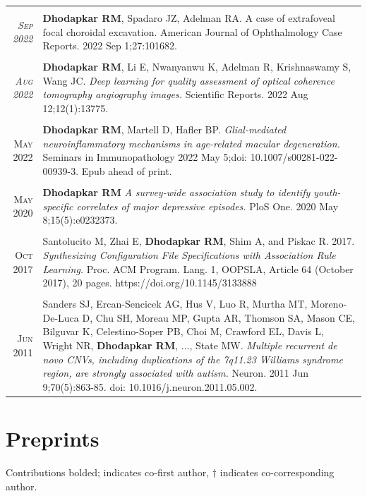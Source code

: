 \documentclass[a4paper,10pt]{article}
\begin{document}
\begin{longtable}{rp{11cm}}
 \\
\multicolumn{2}{c}{} \\
 \textit{\textsc{Sep} 2022}& {\bf Dhodapkar RM}, Spadaro JZ, Adelman RA. A case of extrafoveal focal choroidal excavation. American Journal of Ophthalmology Case Reports. 2022 Sep 1;27:101682. \\
\multicolumn{2}{c}{} \\
 \textit{\textsc{Aug 2022}}& {\bf Dhodapkar RM}, Li E, Nwanyanwu K, Adelman R, Krishnaswamy S, Wang JC. {\it Deep learning for quality assessment of optical coherence tomography angiography images.} Scientific Reports. 2022 Aug 12;12(1):13775. \\
\multicolumn{2}{c}{} \\
 \textsc{May} 2022 & {\bf Dhodapkar RM}, Martell D, Hafler BP. {\it Glial-mediated neuroinflammatory mechanisms in age-related macular degeneration.} Seminars in Immunopathology 2022 May 5;doi: 10.1007/s00281-022-00939-3. Epub ahead of print. \\
\multicolumn{2}{c}{} \\
 \textsc{May} 2020 & {\bf Dhodapkar RM} {\it A survey-wide association study to identify youth-specific correlates of major depressive episodes.} PloS One. 2020 May 8;15(5):e0232373. \\
\multicolumn{2}{c}{} \\
 \textsc{Oct} 2017 & Santolucito M, Zhai E, {\bf Dhodapkar RM}, Shim A, and Piskac R. 2017. {\it Synthesizing Configuration
File Specifications with Association Rule Learning.} Proc. ACM Program. Lang. 1, OOPSLA, Article 64
(October 2017), 20 pages. https://doi.org/10.1145/3133888 \\
\multicolumn{2}{c}{} \\
 \textsc{Jun} 2011 & Sanders SJ, Ercan-Sencicek AG, Hus V, Luo R, Murtha MT, Moreno-De-Luca D, Chu SH, Moreau MP, Gupta AR, Thomson SA, Mason CE, Bilguvar K, Celestino-Soper PB, Choi M, Crawford EL, Davis L, Wright NR, {\bf Dhodapkar RM}, ..., State MW. {\it Multiple recurrent de novo CNVs, including duplications of the 7q11.23 Williams syndrome region, are strongly associated with autism.} Neuron. 2011 Jun 9;70(5):863-85. doi: 10.1016/j.neuron.2011.05.002. 
\end{longtable}

\newpage
\section{Preprints}
Contributions bolded; {\bf *} indicates co-first author, {\bf $\dag$} indicates co-corresponding author. 
\end{document}
